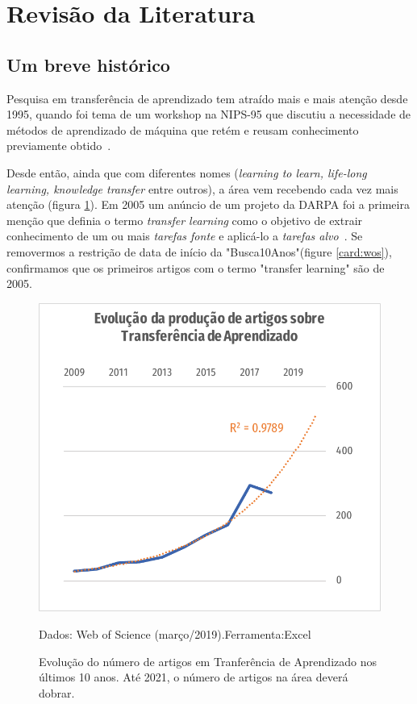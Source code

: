 \documentclass[sigconf]{acmart}
\newcommand{\source}[2]{\raggedleft{}\vspace*{-7mm}\caption*{ \textmd{\scriptsize{Dados: {#1}.\hfill Ferramenta:{#2}}}}}
\begin{document}
\section{Revisão da Literatura}
  \subsection{Um breve histórico}
  Pesquisa em transferência de aprendizado tem atraído mais e mais atenção desde 1995, quando foi tema de  um workshop na NIPS-95 que discutiu a necessidade de métodos de aprendizado de máquina que retém e reusam conhecimento previamente obtido~\cite{PanYang}. 
  
  Desde então, ainda que com diferentes nomes (\emph{learning to learn, life-long learning, knowledge transfer} entre outros), a área vem recebendo cada vez mais atenção (figura \ref{fig:artigos_por_ano}). Em 2005 um anúncio de um projeto da DARPA foi a primeira menção que definia o termo \emph{transfer learning} como o objetivo de extrair conhecimento de um ou mais \emph{tarefas fonte} e aplicá-lo a \emph{tarefas alvo}~\cite{PanYang}. Se removermos a restrição de data de início da "Busca10Anos"(figure \ref{card:wos}), confirmamos que os primeiros artigos com o termo "transfer learning" são de 2005.

  \begin{figure}[h]
    \includegraphics[width=\columnwidth]{artigos_por_ano}
    \source{Web of Science (março/2019)}{Excel}
    \caption{Evolução do número de artigos em Tranferência de Aprendizado nos últimos 10 anos. Até 2021, o número de artigos na área deverá dobrar.}
    \label{fig:artigos_por_ano}
  \end{figure}
\end{document}
